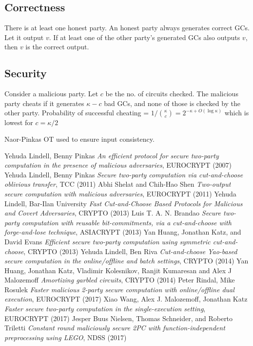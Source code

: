 \subsection{Correctness}
There is at least one honest party. An honest party always generates correct GCs. Let it output $v$. If at least one of the other party's generated GCs also outputs $v$, then $v$ is the correct output.

\subsection{Security}
Consider a malicious party. Let $c$ be the no. of circuits checked. The malicious party cheats if it generates $\kappa-c$ bad GCs, and none of those is checked by the other party. Probability of successful cheating = $1/\binom{\kappa}{c} = 2^{-\kappa+O(\log \kappa)}$ which is lowest for $c = \kappa/2$

Naor-Pinkas OT used to ensure input consistency.
\begin{thebibliography}{99}

 Yehuda Lindell, Benny Pinkas \emph{An efficient protocol for secure two-party computation in the presence of malicious adversaries}, {EUROCRYPT} (2007)
 Yehuda Lindell, Benny Pinkas \emph{Secure two-party computation via cut-and-choose oblivious transfer}, {TCC} (2011)
 Abhi Shelat and Chih-Hao Shen \emph{Two-output secure computation with malicious adversaries}, {EUROCRYPT} (2011)
 Yehuda Lindell, Bar-Ilan University \emph{Fast Cut-and-Choose Based Protocols for Malicious and Covert Adversaries}, {CRYPTO} (2013)
 Luis T. A. N. Brandao \emph{Secure two-party computation with reusable bit-commitments, via a cut-and-choose with forge-and-lose technique}, {ASIACRYPT} (2013)
 Yan Huang, Jonathan Katz, and David Evans \emph{Efficient secure two-party computation using symmetric cut-and-choose}, {CRYPTO} (2013)
 Yehuda Lindell, Ben Riva \emph{Cut-and-choose Yao-based secure computation in the online/offline and batch settings}, {CRYPTO} (2014)
 Yan Huang, Jonathan Katz, Vladimir Kolesnikov, Ranjit Kumaresan and Alex J Malozemoff \emph{Amortizing garbled circuits}, {CRYPTO} (2014)
 Peter Rindal, Mike Rosulek \emph{Faster malicious 2-party secure computation with online/offline dual execution}, {EUROCRYPT} (2017)
 Xiao Wang, Alex J. Malozemoff, Jonathan Katz \emph{Faster secure two-party computation in the single-execution setting}, {EUROCRYPT} (2017)
 Jesper Buus Nielsen, Thomas Schneider, and Roberto Triletti \emph{Constant round maliciously
secure 2PC with function-independent preprocessing using LEGO}, {NDSS} (2017)

\end{thebibliography}

%
